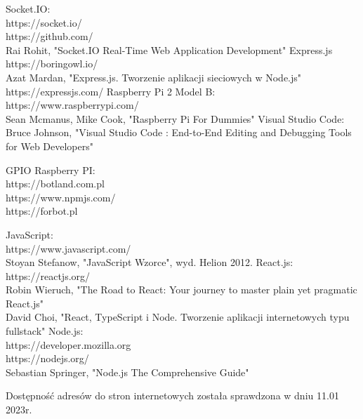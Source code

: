 \begin{thebibliography}{1}
 Socket.IO:
\\
https://socket.io/
\\
https://github.com/
\\
Rai Rohit, "Socket.IO Real-Time Web Application Development"
 Express.js
\\ 
https://boringowl.io/
\\
Azat Mardan, "Express.js. Tworzenie aplikacji sieciowych w Node.js"
https://expressjs.com/
Raspberry Pi 2 Model B:
\\
https://www.raspberrypi.com/
\\
 Sean Mcmanus, Mike Cook, "Raspberry Pi For Dummies"
Visual Studio Code:
\\
Bruce Johnson, "Visual Studio Code : End-to-End Editing and Debugging Tools for Web Developers"

 GPIO Raspberry PI:
\\
https://botland.com.pl
\\
https://www.npmjs.com/
\\
https://forbot.pl

 JavaScript:
\\
https://www.javascript.com/
\\
Stoyan Stefanow, "JavaScript Wzorce", wyd. Helion 2012.
React.js:
\\
https://reactjs.org/
\\
Robin Wieruch, "The Road to React: Your journey to master plain yet pragmatic React.js"
\\
David Choi, "React, TypeScript i Node. Tworzenie aplikacji internetowych typu fullstack"
Node.js:
\\
https://developer.mozilla.org
\\
https://nodejs.org/
\\
Sebastian Springer, "Node.js The Comprehensive Guide"

Dostępność adresów do stron internetowych została sprawdzona w dniu 11.01 2023r.

\end{thebibliography}



